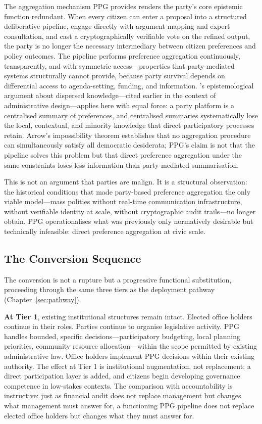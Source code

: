 \documentclass[12pt,a4paper,oneside]{report}
\begin{document}
The aggregation mechanism PPG provides renders the party's core epistemic function redundant. When every citizen can enter a proposal into a structured deliberative pipeline, engage directly with argument mapping and expert consultation, and cast a cryptographically verifiable vote on the refined output, the party is no longer the necessary intermediary between citizen preferences and policy outcomes. The pipeline performs preference aggregation continuously, transparently, and with symmetric access---properties that party-mediated systems structurally cannot provide, because party survival depends on differential access to agenda-setting, funding, and information. \citet{hayek1945use}'s epistemological argument about dispersed knowledge---cited earlier in the context of administrative design---applies here with equal force: a party platform is a centralised summary of preferences, and centralised summaries systematically lose the local, contextual, and minority knowledge that direct participatory processes retain. Arrow's impossibility theorem \citep{arrow1951social} establishes that no aggregation procedure can simultaneously satisfy all democratic desiderata; PPG's claim is not that the pipeline solves this problem but that direct preference aggregation under the same constraints loses less information than party-mediated summarisation.

This is not an argument that parties are malign. It is a structural observation: the historical conditions that made party-based preference aggregation the only viable model---mass polities without real-time communication infrastructure, without verifiable identity at scale, without cryptographic audit trails---no longer obtain. PPG operationalises what was previously only normatively desirable but technically infeasible: direct preference aggregation at civic scale.

\subsection{The Conversion Sequence}

The conversion is not a rupture but a progressive functional substitution, proceeding through the same three tiers as the deployment pathway (Chapter~\ref{sec:pathway}).

\textbf{At Tier 1}, existing institutional structures remain intact. Elected office holders continue in their roles. Parties continue to organise legislative activity. PPG handles bounded, specific decisions---participatory budgeting, local planning priorities, community resource allocation---within the scope permitted by existing administrative law. Office holders implement PPG decisions within their existing authority. The effect at Tier 1 is institutional augmentation, not replacement: a direct participation layer is added, and citizens begin developing governance competence in low-stakes contexts. The comparison with accountability is instructive: just as financial audit does not replace management but changes what management must answer for, a functioning PPG pipeline does not replace elected office holders but changes what they must answer for.
\end{document}
